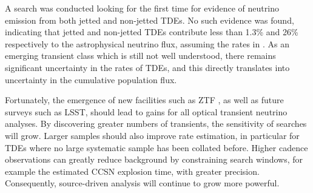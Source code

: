 \documentclass{PoS}
\begin{document}
A search was conducted looking for the first time for evidence of neutrino emission from both jetted and non-jetted TDEs. No such evidence was found, indicating that jetted and non-jetted TDEs contribute less than 1.3\% and 26\% respectively to the astrophysical neutrino flux, assuming the rates in \cite{vanVelzen:2017qum, Sun:2015bda}. As an emerging transient class which is still not well understood, there remains significant uncertainty in the rates of TDEs, and this directly translates into uncertainty in the cumulative population flux. 

Fortunately, the emergence of new facilities such as ZTF \cite{2019PASP..131a8002B}, as well as future surveys such as LSST, should lead to gains for all optical transient neutrino analyses. By discovering greater numbers of transients, the sensitivity of searches will grow. Larger samples should also improve rate estimation, in particular for TDEs where no large systematic sample has been collated before. Higher cadence observations can greatly reduce background by constraining search windows, for example the estimated CCSN explosion time, with greater precision. Consequently, source-driven analysis will continue to grow more powerful.




%
\end{document}
